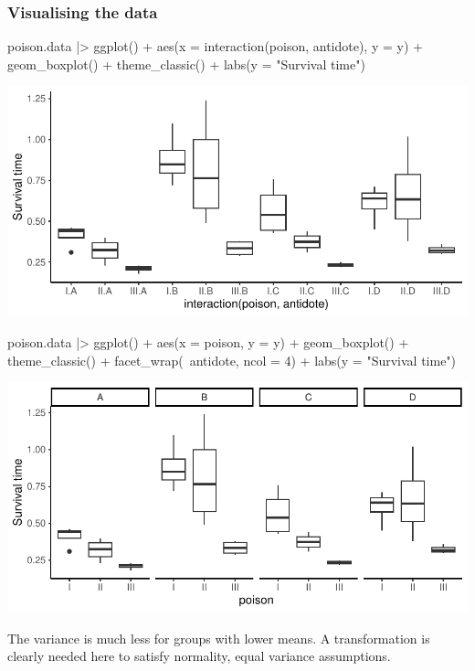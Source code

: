 \documentclass[a4paper]{article}\usepackage[]{graphicx}\usepackage[]{xcolor}
\makeatletter
\def\maxwidth{ %
  \ifdim\Gin@nat@width>\linewidth
    \linewidth
  \else
    \Gin@nat@width
  \fi
}
\makeatother
\begin{document}
\subsubsection{Visualising the data}
\begin{Schunk}
\begin{Sinput}
poison.data |> ggplot() + 
  aes(x = interaction(poison, antidote), y = y) +
  geom_boxplot() + 
  theme_classic() + 
  labs(y = "Survival time")
\end{Sinput}


{\centering \includegraphics[width=\maxwidth]{figure/listings-unnamed-chunk-303-1} 

}

\begin{Sinput}
poison.data |> ggplot() + 
  aes(x = poison, y = y) +
  geom_boxplot() + 
  theme_classic() + 
  facet_wrap(~antidote, ncol = 4) + 
  labs(y = "Survival time")
\end{Sinput}


{\centering \includegraphics[width=\maxwidth]{figure/listings-unnamed-chunk-303-2} 

}

\end{Schunk}
The variance is much less for groups with lower means. A transformation is clearly needed here to satisfy normality, equal variance assumptions.
\end{document}
